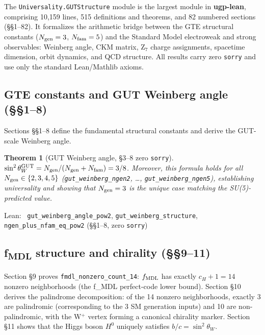 \documentclass[11pt,a4paper]{article}
\newenvironment{leanref}%
  {\par\smallskip\noindent\begingroup\raggedright\textup{Lean:}~}%
  {\par\endgroup}
\newtheorem{theorem}{Theorem}[section]
\theoremstyle{definition}
\begin{document}
The \texttt{Universality.GUTStructure} module is the largest module in \textbf{ugp-lean},
comprising 10{,}159 lines, 515 definitions and theorems, and 82 numbered sections
(§§1–82).  It formalizes the arithmetic bridge between the GTE structural constants
($N_{\rm gen}=3$, $N_{\rm fam}=5$) and the Standard Model electroweak and strong
observables: Weinberg angle, CKM matrix, Z$_7$ charge assignments, spacetime dimension,
orbit dynamics, and QCD structure.  All results carry zero \texttt{sorry} and use only
the standard Lean/Mathlib axioms.

\subsection{GTE constants and GUT Weinberg angle (§§1–8)}\label{subsec:gut-constants}

Sections §§1–8 define the fundamental structural constants and derive the GUT-scale
Weinberg angle.

\begin{theorem}[GUT Weinberg angle, §3--8 zero \texttt{sorry}]
$\sin^2\theta_W^{\rm GUT} = N_{\rm gen}/(N_{\rm gen}+N_{\rm fam}) = 3/8$.
Moreover, this formula holds for all $N_{\rm gen}\in\{2,3,4,5\}$
(\lstinline|gut_weinberg_ngen2|, \ldots, \lstinline|gut_weinberg_ngen5|), establishing
universality and showing that $N_{\rm gen}=3$ is the unique case matching the
SU(5)-predicted value.
\end{theorem}

\begin{leanref}
\lstinline|gut_weinberg_angle_pow2|, \lstinline|gut_weinberg_structure|,
\lstinline|ngen_plus_nfam_eq_pow2|
\textup{(§§1–8, zero \texttt{sorry})}
\end{leanref}

\subsection{f\textsubscript{MDL} structure and chirality (§§9--11)}\label{subsec:gut-fmdl}

Section §9 proves \lstinline|fmdl_nonzero_count_14|: $f_{\rm MDL}$ has exactly
$c_H + 1 = 14$ nonzero neighborhoods (the f\_MDL perfect-code lower bound).
Section §10 derives the palindrome decomposition: of the 14 nonzero neighborhoods, exactly
3 are palindromic (corresponding to the 3 SM generation inputs) and 10 are non-palindromic,
with the W$^+$ vertex forming a canonical chirality marker.
Section §11 shows that the Higgs boson $H^0$ uniquely satisfies $b/c = \sin^2\theta_W$.
\end{document}
